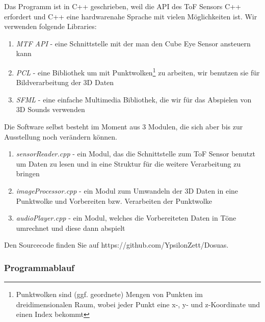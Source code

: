 \documentclass[a4paper,12pt,ngerman]{scrartcl}
\begin{document}
Das Programm ist in C++ geschrieben, weil die API des ToF Sensors C++ erfordert und C++ eine hardwarenahe
Sprache mit vielen Möglichkeiten ist. Wir verwenden folgende Libraries:
\begin{enumerate}
	\item \textit{MTF API} - eine Schnittstelle mit der man den Cube Eye Sensor ansteuern kann
	\item \textit{PCL} - eine Bibliothek um mit Punktwolken\footnote{Punktwolken sind (ggf. geordnete) Mengen von Punkten im dreidimensionalen Raum, 
		wobei jeder Punkt eine x-, y- und z-Koordinate und einen Index bekommt} zu arbeiten, wir benutzen 
	sie für Bildverarbeitung der 3D Daten
	\item \textit{SFML} - eine einfache Multimedia Bibliothek, 
	die wir für das Abspielen von 3D Sounds verwenden 
\end{enumerate} 
Die Software selbst besteht im Moment aus 3 Modulen, die sich aber bis zur Ausstellung noch verändern 
können.
\begin{enumerate}
	\item \textit{sensorReader.cpp} - ein Modul, das die Schnittstelle zum ToF Sensor benutzt um Daten zu 
	lesen und in eine Struktur für die weitere Verarbeitung zu bringen
	\item \textit{imageProcessor.cpp} - ein Modul zum Umwandeln der 3D Daten in eine Punktwolke und 
	Vorbereiten bzw. Verarbeiten der Punktwolke
	\item \textit{audioPlayer.cpp} - ein Modul, welches die Vorbereiteten Daten in Töne umrechnet und 
	diese dann abspielt
\end{enumerate}

Den Sourcecode finden Sie auf https://github.com/YpsilonZett/Dosuas.

\subsubsection{Programmablauf}
\end{document}
